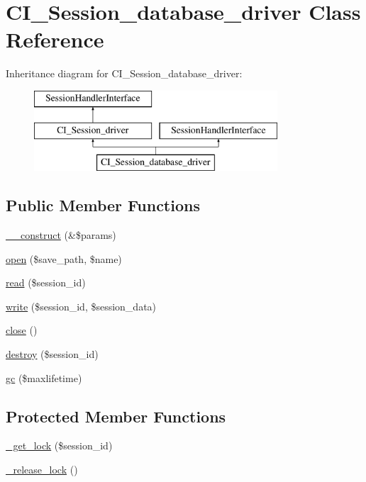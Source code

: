 \hypertarget{class_c_i___session__database__driver}{}\section{C\+I\+\_\+\+Session\+\_\+database\+\_\+driver Class Reference}
\label{class_c_i___session__database__driver}
Inheritance diagram for C\+I\+\_\+\+Session\+\_\+database\+\_\+driver\+:\begin{figure}[H]
\begin{center}
\leavevmode
\includegraphics[height=3.000000cm]{class_c_i___session__database__driver}
\end{center}
\end{figure}
\subsection*{Public Member Functions}
\begin{DoxyCompactItemize}
\item 
\hyperlink{class_c_i___session__database__driver_ac1669c73d53d6f16cf5459a1e84d39c8}{\+\_\+\+\_\+construct} (\&\$params)
\item 
\hyperlink{class_c_i___session__database__driver_a614b5cf3840833913c7a73260ed28e02}{open} (\$save\+\_\+path, \$name)
\item 
\hyperlink{class_c_i___session__database__driver_a5bbf84ebf657be4eaccc0582377c76bf}{read} (\$session\+\_\+id)
\item 
\hyperlink{class_c_i___session__database__driver_ad9d124885be93668f1dbf6aace5964f5}{write} (\$session\+\_\+id, \$session\+\_\+data)
\item 
\hyperlink{class_c_i___session__database__driver_aa69c8bf1f1dcf4e72552efff1fe3e87e}{close} ()
\item 
\hyperlink{class_c_i___session__database__driver_aaec5812f6b4eb6835f88d3baa06a002a}{destroy} (\$session\+\_\+id)
\item 
\hyperlink{class_c_i___session__database__driver_a57aff7ee0656d8aa75d545fb8b3ae35d}{gc} (\$maxlifetime)
\end{DoxyCompactItemize}
\subsection*{Protected Member Functions}
\begin{DoxyCompactItemize}
\item 
\hyperlink{class_c_i___session__database__driver_a2c49c8e23be3e2aca96a9d20de18ffc2}{\+\_\+get\+\_\+lock} (\$session\+\_\+id)
\item 
\hyperlink{class_c_i___session__database__driver_a0265e356e6cf1eaba229663c1664c37d}{\+\_\+release\+\_\+lock} ()
\end{DoxyCompactItemize}
